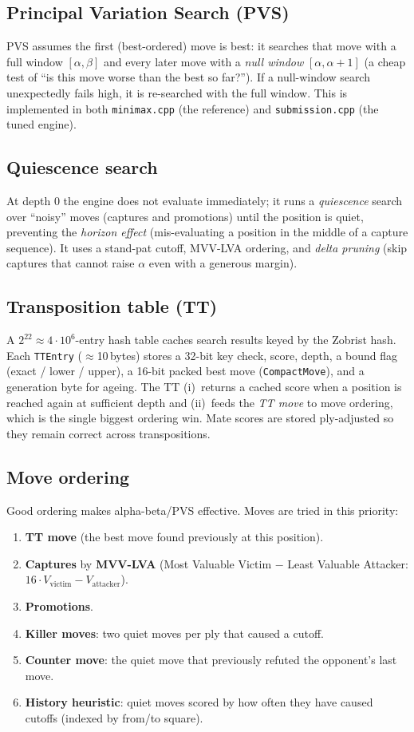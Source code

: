 \documentclass[11pt]{article}
\newcommand{\code}[1]{\texttt{#1}}
\begin{document}
\subsection{Principal Variation Search (PVS)}
PVS assumes the first (best-ordered) move is best: it searches that move with a
full window $[\alpha,\beta]$ and every later move with a \emph{null window}
$[\alpha,\alpha{+}1]$ (a cheap test of ``is this move worse than the best so
far?''). If a null-window search unexpectedly fails high, it is re-searched with
the full window. This is implemented in both \code{minimax.cpp} (the reference)
and \code{submission.cpp} (the tuned engine).

\subsection{Quiescence search}
At depth 0 the engine does not evaluate immediately; it runs a
\emph{quiescence} search over ``noisy'' moves (captures and promotions) until the
position is quiet, preventing the \emph{horizon effect} (mis-evaluating a
position in the middle of a capture sequence). It uses a stand-pat cutoff, MVV-LVA
ordering, and \emph{delta pruning} (skip captures that cannot raise $\alpha$ even
with a generous margin).

\subsection{Transposition table (TT)}
A $2^{22}\approx4{\cdot}10^6$-entry hash table caches search results keyed by the
Zobrist hash. Each \code{TTEntry} ($\approx$10\,bytes) stores a 32-bit key check,
score, depth, a bound flag (exact / lower / upper), a 16-bit packed best move
(\code{CompactMove}), and a generation byte for ageing. The TT (i)~returns a
cached score when a position is reached again at sufficient depth and (ii)~feeds
the \emph{TT move} to move ordering, which is the single biggest ordering win.
Mate scores are stored ply-adjusted so they remain correct across transpositions.

\subsection{Move ordering}
Good ordering makes alpha-beta/PVS effective. Moves are tried in this priority:
\begin{enumerate}[nosep]
  \item \textbf{TT move} (the best move found previously at this position).
  \item \textbf{Captures} by \textbf{MVV-LVA} (Most Valuable Victim $-$ Least
        Valuable Attacker: $16\cdot V_{\text{victim}} - V_{\text{attacker}}$).
  \item \textbf{Promotions}.
  \item \textbf{Killer moves}: two quiet moves per ply that caused a cutoff.
  \item \textbf{Counter move}: the quiet move that previously refuted the
        opponent's last move.
  \item \textbf{History heuristic}: quiet moves scored by how often they have
        caused cutoffs (indexed by from/to square).
\end{enumerate}
\end{document}
